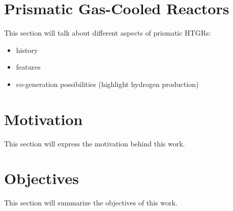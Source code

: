 \section{Prismatic Gas-Cooled Reactors}

This section will talk about different aspects of prismatic HTGRs:

\begin{itemize}
	\item history
	\item features
	\item co-generation possibilities (highlight hydrogen production)
\end{itemize}

\section{Motivation}

This section will express the motivation behind this work.

\section{Objectives}

This section will summarize the objectives of this work.
